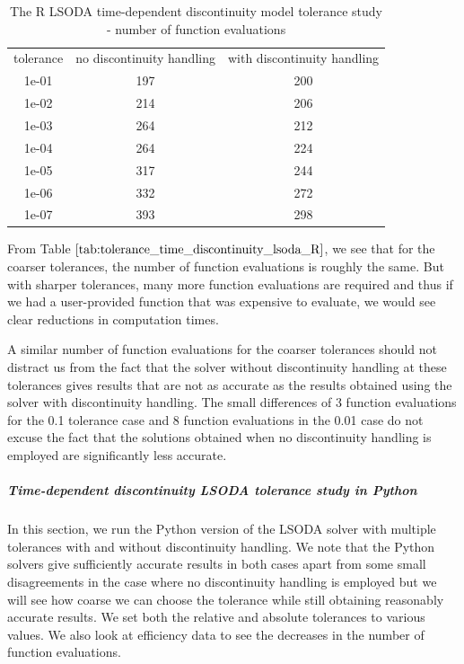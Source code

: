 \begin{table}[H]
\caption {The R LSODA time-dependent discontinuity model tolerance study - number of function evaluations} \label{tab:tolerance_time_discontinuity_lsoda_R} 
\begin{center}
\begin{tabular}{ c c c }
tolerance & no discontinuity handling & with discontinuity handling \\ 
1e-01 & 197 & 200 \\
1e-02 & 214 & 206 \\
1e-03 & 264 & 212 \\
1e-04 & 264 & 224 \\
1e-05 & 317 & 244 \\
1e-06 & 332 & 272 \\
1e-07 & 393 & 298 \\
\end{tabular}
\end{center}
\end{table}

From Table $\ref{tab:tolerance_time_discontinuity_lsoda_R}$, we see that for the coarser tolerances, the number of function evaluations is roughly the same. But with sharper tolerances, many more function evaluations are required and thus if we had a user-provided function that was expensive to evaluate, we would see clear reductions in computation times.

A similar number of function evaluations for the coarser tolerances should not distract us from the fact that the solver without discontinuity handling at these tolerances gives results that are not as accurate as the results obtained using the solver with discontinuity handling. The small differences of 3 function evaluations for the 0.1 tolerance case and 8 function evaluations in the 0.01 case do not excuse the fact that the solutions obtained when no discontinuity handling is employed are significantly less accurate.

\subparagraph{Time-dependent discontinuity LSODA tolerance study in Python}
In this section, we run the Python version of the LSODA solver with multiple tolerances with and without discontinuity handling. We note that the Python solvers give sufficiently accurate results in both cases apart from some small disagreements in the case where no discontinuity handling is employed but we will see how coarse we can choose the tolerance while still obtaining reasonably accurate results. We set both the relative and absolute tolerances to various values. We also look at efficiency data to see the decreases in the number of function evaluations.

